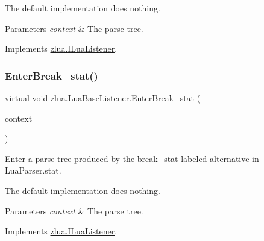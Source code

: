 The default implementation does nothing.


\begin{DoxyParams}{Parameters}
{\em context} & The parse tree.\\
\hline
\end{DoxyParams}


Implements \mbox{\hyperlink{interfacezlua_1_1_i_lua_listener_a490f8ae28bd42601f32bd54fc9058e24}{zlua.\+I\+Lua\+Listener}}.

\mbox{\label{classzlua_1_1_lua_base_listener_a6adb675854ff8e7a3a92ca58e5f198b2}} 
\subsubsection{\texorpdfstring{Enter\+Break\+\_\+stat()}{EnterBreak\_stat()}}
{\footnotesize\ttfamily virtual void zlua.\+Lua\+Base\+Listener.\+Enter\+Break\+\_\+stat (\begin{DoxyParamCaption}\item[{\mbox{[}\+Not\+Null\mbox{]} \mbox{\hyperlink{classzlua_1_1_lua_parser_1_1_break__stat_context}{Lua\+Parser.\+Break\+\_\+stat\+Context}}}]{context }\end{DoxyParamCaption})\hspace{0.3cm}{\ttfamily [virtual]}}



Enter a parse tree produced by the {\ttfamily break\+\_\+stat} labeled alternative in Lua\+Parser.\+stat. 

The default implementation does nothing.


\begin{DoxyParams}{Parameters}
{\em context} & The parse tree.\\
\hline
\end{DoxyParams}


Implements \mbox{\hyperlink{interfacezlua_1_1_i_lua_listener_aa77c8634ee96ca2069ceb9e93b2bae57}{zlua.\+I\+Lua\+Listener}}.

\mbox{\label{classzlua_1_1_lua_base_listener_a441cbddff1cc031c9eec17003ddff72f}} 
